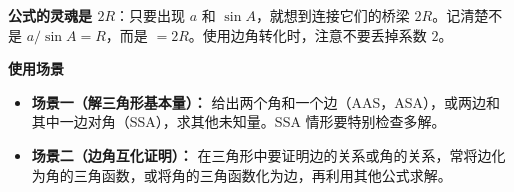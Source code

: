 \begin{explanationbox}
	\textbf{公式的灵魂是 $2R$}：只要出现 $a$ 和 $\sin A$，就想到连接它们的桥梁 $2R$。记清楚不是 $a/\sin A = R$，而是 $=2R$。使用边角转化时，注意不要丢掉系数 $2$。

	\medskip
	\textbf{\textcolor{CExplanation}{使用场景}}
	\begin{itemize}[leftmargin=*, itemsep=0.5em, topsep=0.4em]
		\item \textbf{场景一（解三角形基本量）：} 给出两个角和一个边（AAS，ASA），或两边和其中一边对角（SSA），求其他未知量。SSA 情形要特别检查多解。
		\item \textbf{场景二（边角互化证明）：} 在三角形中要证明边的关系或角的关系，常将边化为角的三角函数，或将角的三角函数化为边，再利用其他公式求解。
	\end{itemize}
\end{explanationbox}